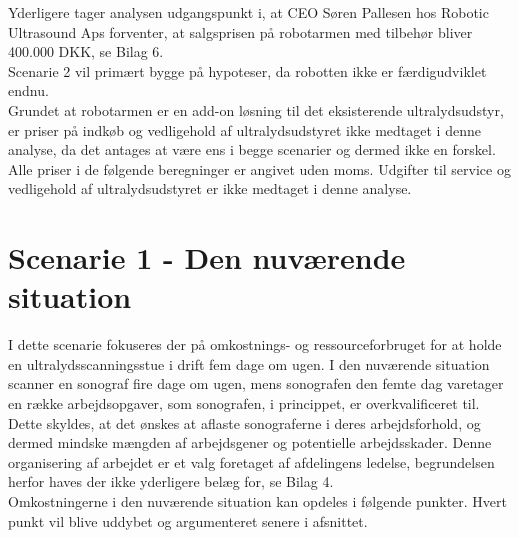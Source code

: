 Yderligere tager analysen udgangspunkt i, at CEO Søren Pallesen hos Robotic Ultrasound Aps forventer, at salgsprisen på robotarmen med tilbehør bliver 400.000 DKK, se Bilag 6. \\
Scenarie 2 vil primært bygge på hypoteser, da robotten ikke er færdigudviklet endnu. \\
Grundet at robotarmen er en add-on løsning til det eksisterende ultralydsudstyr, er priser på indkøb og vedligehold af ultralydsudstyret ikke medtaget i denne analyse, da det antages at være ens i begge scenarier og dermed ikke en forskel. Alle priser i de følgende beregninger er angivet uden moms. Udgifter til service og vedligehold af ultralydsudstyret er ikke medtaget i denne analyse. 

\section{Scenarie 1 - Den nuværende situation} \label{nuvaerende}
I dette scenarie fokuseres der på omkostnings- og ressourceforbruget for at holde en ultralydsscanningsstue i drift fem dage om ugen. I den nuværende situation scanner en sonograf fire dage om ugen, mens sonografen den femte dag varetager en række arbejdsopgaver, som sonografen, i princippet, er overkvalificeret til. Dette skyldes, at det ønskes at aflaste sonograferne i deres arbejdsforhold, og dermed mindske mængden af arbejdsgener og potentielle arbejdsskader. Denne organisering af arbejdet er et valg foretaget af afdelingens ledelse, begrundelsen herfor haves der ikke yderligere belæg for, se Bilag 4. \\ 
Omkostningerne i den nuværende situation kan opdeles i følgende punkter. Hvert punkt vil blive uddybet og argumenteret senere i afsnittet.

